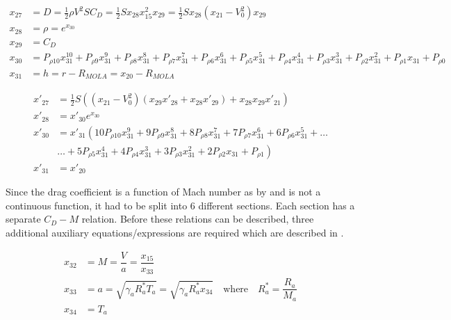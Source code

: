  \begin{equation} \label{eq:dragAux}
\begin{split}
x_{27} &= D = \frac{1}{2}\rho V^{2}SC_{D} = \frac{1}{2}S x_{28}x_{15}^{2}x_{29}=\frac{1}{2}S x_{28}\left(x_{21}-V_{0}^{2}\right) x_{29}\\
x_{28} &= \rho = e^{x_{30}} \\
x_{29} &= C_{D} \\
x_{30} &= P_{\rho 10}x_{31}^{10}+P_{\rho 9}x_{31}^{9}+P_{\rho 8}x_{31}^{8}+P_{\rho 7}x_{31}^{7}+P_{\rho 6}x_{31}^{6}+P_{\rho 5}x_{31}^{5}+P_{\rho 4}x_{31}^{4}+P_{\rho 3}x_{31}^{3}+P_{\rho 2}x_{31}^{2}+P_{\rho 1}x_{31}+P_{\rho 0} \\
x_{31} &= h = r-R_{MOLA} = x_{20}-R_{MOLA}
\end{split}
\end{equation}

 \begin{equation} \label{eq:dragDerAux}
\begin{split}
x'_{27} &= \frac{1}{2}S\left(\left(x_{21}-V_{0}^{2}\right) \left(x_{29}x'_{28}+x_{28}x'_{29}\right)+x_{28}x_{29}x'_{21}\right) \\
x'_{28} &= x'_{30}e^{x_{30}} \\
x'_{30} &=x'_{31} \left(10 P_{\rho 10}x_{31}^{9}+9 P_{\rho 9}x_{31}^{8}+8 P_{\rho 8}x_{31}^{7}+7 P_{\rho 7}x_{31}^{6}+6 P_{\rho 6}x_{31}^{5}+\dots \right. \\
&  \left. \dotsc +5 P_{\rho 5}x_{31}^{4}+4 P_{\rho 4}x_{31}^{3}+3 P_{\rho 3}x_{31}^{2}+2 P_{\rho 2}x_{31}+P_{\rho 1}\right) \\
x'_{31} &= x'_{20}
\end{split}
\end{equation}

Since the drag coefficient is a function of Mach number as by  and is not a continuous function, it had to be split into 6 different sections. Each section has a separate $C_{D}-M$ relation. Before these relations can be described, three additional auxiliary equations/expressions are required which are described in .

 \begin{equation} \label{eq:cdAux}
\begin{split}
x_{32} &= M = \dfrac{V}{a} = \dfrac{x_{15}}{x_{33}}\\
x_{33} &= a = \sqrt{\gamma_{a}R_{a}^{*}T_{a}} = \sqrt{\gamma_{a}R_{a}^{*}x_{34}} \quad \text{where} \quad R_{a}^{*}=\dfrac{R_{a}}{M_{a}} \\
x_{34} &= T_{a}
\end{split}
\end{equation}

